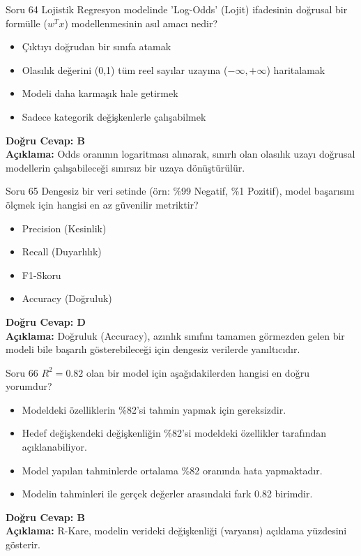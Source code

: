 \documentclass[12pt,a4paper]{article}
\begin{document}
\begin{testcard}{Soru 64}
    Lojistik Regresyon modelinde 'Log-Odds' (Lojit) ifadesinin doğrusal bir formülle ($w^T x$) modellenmesinin asıl amacı nedir?
    \begin{itemize}
        \item[A)] Çıktıyı doğrudan bir sınıfa atamak
        \item[B)] Olasılık değerini (0,1) tüm reel sayılar uzayına ($-\infty, +\infty$) haritalamak
        \item[C)] Modeli daha karmaşık hale getirmek
        \item[D)] Sadece kategorik değişkenlerle çalışabilmek
    \end{itemize}
    \tcblower
    \textbf{Doğru Cevap: B} \\
    \textbf{Açıklama:} Odds oranının logaritması alınarak, sınırlı olan olasılık uzayı doğrusal modellerin çalışabileceği sınırsız bir uzaya dönüştürülür.
\end{testcard}

\begin{testcard}{Soru 65}
    Dengesiz bir veri setinde (örn: \%99 Negatif, \%1 Pozitif), model başarısını ölçmek için hangisi en az güvenilir metriktir?
    \begin{itemize}
        \item[A)] Precision (Kesinlik)
        \item[B)] Recall (Duyarlılık)
        \item[C)] F1-Skoru
        \item[D)] Accuracy (Doğruluk)
    \end{itemize}
    \tcblower
    \textbf{Doğru Cevap: D} \\
    \textbf{Açıklama:} Doğruluk (Accuracy), azınlık sınıfını tamamen görmezden gelen bir modeli bile başarılı gösterebileceği için dengesiz verilerde yanıltıcıdır.
\end{testcard}

\begin{testcard}{Soru 66}
    $R^2 = 0.82$ olan bir model için aşağıdakilerden hangisi en doğru yorumdur?
    \begin{itemize}
        \item[A)] Modeldeki özelliklerin \%82'si tahmin yapmak için gereksizdir.
        \item[B)] Hedef değişkendeki değişkenliğin \%82'si modeldeki özellikler tarafından açıklanabiliyor.
        \item[C)] Model yapılan tahminlerde ortalama \%82 oranında hata yapmaktadır.
        \item[D)] Modelin tahminleri ile gerçek değerler arasındaki fark 0.82 birimdir.
    \end{itemize}
    \tcblower
    \textbf{Doğru Cevap: B} \\
    \textbf{Açıklama:} R-Kare, modelin verideki değişkenliği (varyansı) açıklama yüzdesini gösterir.
\end{testcard}
\end{document}
